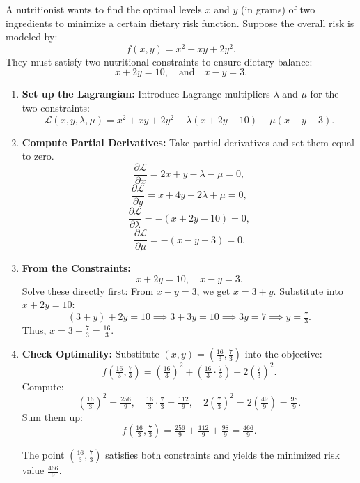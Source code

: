 \exampleline
\begin{example}
A nutritionist wants to find the optimal levels \( x \) and \( y \) (in grams) of two ingredients to minimize a certain dietary risk function. Suppose the overall risk is modeled by:
\[
f(x,y) = x^2 + xy + 2y^2.
\]
They must satisfy two nutritional constraints to ensure dietary balance:
\[
x + 2y = 10, \quad \text{and} \quad x - y = 3.
\]

\begin{solution}
\begin{enumerate}
    \item \textbf{Set up the Lagrangian:} Introduce Lagrange multipliers \(\lambda\) and \(\mu\) for the two constraints:
    \[
    \mathcal{L}(x,y,\lambda,\mu) = x^2 + xy + 2y^2 - \lambda(x + 2y - 10) - \mu(x - y - 3).
    \]

    \item \textbf{Compute Partial Derivatives:} Take partial derivatives and set them equal to zero.
    \[
    \frac{\partial \mathcal{L}}{\partial x} = 2x + y - \lambda - \mu = 0,
    \]
    \[
    \frac{\partial \mathcal{L}}{\partial y} = x + 4y - 2\lambda + \mu = 0,
    \]
    \[
    \frac{\partial \mathcal{L}}{\partial \lambda} = -(x + 2y - 10) = 0,
    \]
    \[
    \frac{\partial \mathcal{L}}{\partial \mu} = -(x - y - 3) = 0.
    \]

    \item \textbf{From the Constraints:} 
    \[
    x + 2y = 10, \quad x - y = 3.
    \]
    Solve these directly first:
    From \(x - y = 3\), we get \(x = 3 + y\).
    Substitute into \(x + 2y = 10\):
    \[
    (3 + y) + 2y = 10 \implies 3 + 3y = 10 \implies 3y = 7 \implies y = \tfrac{7}{3}.
    \]
    Thus, \(x = 3 + \tfrac{7}{3} = \tfrac{16}{3}\).

    \item \textbf{Check Optimality:}
    Substitute \((x,y)=\left(\tfrac{16}{3}, \tfrac{7}{3}\right)\) into the objective:
    \[
    f\left(\tfrac{16}{3}, \tfrac{7}{3}\right) = \left(\tfrac{16}{3}\right)^2 + \left(\tfrac{16}{3}\cdot\tfrac{7}{3}\right) + 2\left(\tfrac{7}{3}\right)^2.
    \]
    Compute:
    \[
    \left(\tfrac{16}{3}\right)^2 = \tfrac{256}{9}, \quad \tfrac{16}{3}\cdot \tfrac{7}{3}=\tfrac{112}{9}, \quad 2\left(\tfrac{7}{3}\right)^2 = 2\left(\tfrac{49}{9}\right)=\tfrac{98}{9}.
    \]
    Sum them up:
    \[
    f\left(\tfrac{16}{3}, \tfrac{7}{3}\right) = \tfrac{256}{9} + \tfrac{112}{9} + \tfrac{98}{9} = \tfrac{466}{9}.
    \]

    The point \(\left(\tfrac{16}{3}, \tfrac{7}{3}\right)\) satisfies both constraints and yields the minimized risk value \(\frac{466}{9}\).

\end{enumerate}
\end{solution}
\end{example}
\exampleline


